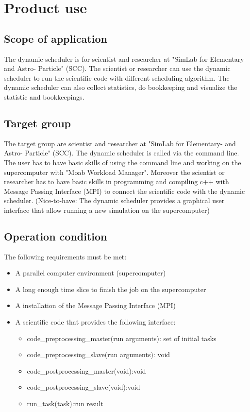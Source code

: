 \section{Product use}

\subsection{Scope of application}
The dynamic scheduler is for scientist and researcher at "SimLab for Elementary- and Astro- Particle" (SCC). The scientist or researcher can use the dynamic scheduler to run the scientific code with different scheduling algorithm. The dynamic scheduler can also collect statistics, do bookkeeping and visualize the statistic and bookkeepings.


\subsection{Target group}

The target group are scientist and researcher at "SimLab for Elementary- and Astro- Particle" (SCC). The dynamic scheduler is called via the command line. The user has to have basic skills of using the command line and working on the supercomputer with "Moab Workload Manager". Moreover the scientist or researcher has to have basic skills in programming and compiling c++ with Message Passing Interface (MPI) to connect the scientific code with the dynamic scheduler.
\linebreak
(Nice-to-have: The dynamic scheduler provides a graphical user interface that allow running a new simulation on the supercomputer)


\subsection{Operation condition}

The following requirements must be met:
\begin{itemize}
	\item A parallel computer environment (supercomputer)
	\item A long enough time slice to finish the job on the supercomputer
	\item A installation of the Message Passing Interface (MPI)
	\item A scientific code that provides the following interface:
		\begin{itemize}
			\item code\_preprocessing\_master(run arguments): set of initial tasks
			\item code\_preprocessing\_slave(run arguments): void
			\item  code\_postprocessing\_master(void):void
			\item  code\_postprocessing\_slave(void):void
			\item run\_task(task):run result
		\end{itemize}
\end{itemize}